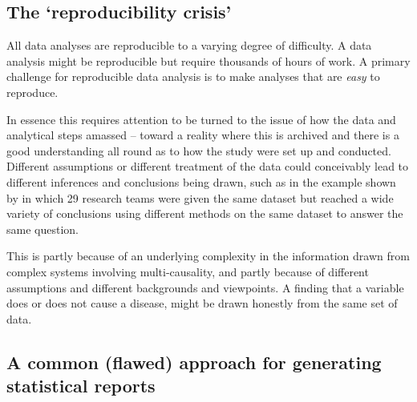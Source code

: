 \documentclass[11pt,a4paper]{article}
\begin{document}
\subsection{The `reproducibility crisis'}

All data analyses are reproducible to a varying degree of difficulty. A data analysis
might be reproducible but require thousands of hours of work. A primary
challenge for reproducible data analysis is to make analyses that are
\emph{easy} to reproduce.

In essence this requires attention to be turned to the issue of how the
data and analytical steps amassed -- toward a reality where this is
archived and there is a good understanding all round as to how the study
were set up and conducted. Different assumptions or different treatment
of the data could conceivably lead to different inferences and
conclusions being drawn, such as in the example shown by \citet{Silberzahn2015} in which 29 research teams were given the same dataset
but reached a wide variety of conclusions using different methods on the
same dataset to answer the same question.

This is partly because of an underlying complexity in the information
drawn from complex systems involving multi-causality, and partly because
of different assumptions and different backgrounds and viewpoints. A
finding that a variable does or does not cause a disease, might be drawn
honestly from the same set of data.


\subsection{A common (flawed) approach for generating statistical reports}
\end{document}

